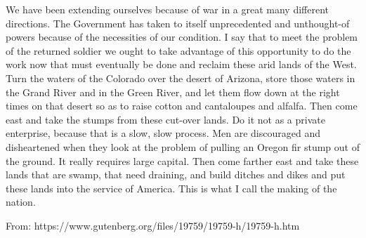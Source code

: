 \begin{linenumbers}
\indent We have been extending ourselves because of war in a great many different directions. The Government has taken to itself unprecedented and unthought-of powers because of the necessities of our condition. I say that to meet the problem of the returned soldier we ought to take advantage of this opportunity to do the work now that must eventually be done and reclaim these arid lands of the West. Turn the waters of the Colorado over the desert of Arizona, store those waters in the Grand River and in the Green River, and let them flow down at the right times on that desert so as to raise cotton and cantaloupes and alfalfa. Then come east and take the stumps from these cut-over lands. Do it not as a private enterprise, because that is a slow, slow process. Men are discouraged and disheartened when they look at the problem of pulling an Oregon fir stump out of the ground. It really requires large capital. Then come farther east and take these lands that are swamp, that need draining, and build ditches and dikes and put these lands into the service of America. This is what I call the making of the nation.
\end{linenumbers}

From: https://www.gutenberg.org/files/19759/19759-h/19759-h.htm

